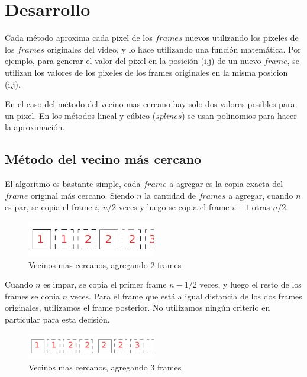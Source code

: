 \section{Desarrollo}

Cada método aproxima cada pixel de los $frames$ nuevos utilizando los pixeles de los $frames$ originales del video, y lo hace utilizando una función matemática. 
Por ejemplo, para generar el valor del pixel en la posición (i,j) de un nuevo $frame$, se utilizan los valores de los pixeles de los frames originales en la misma posicion (i,j). 

En el caso del método del vecino mas cercano hay solo dos valores posibles para un pixel. En los métodos lineal y cúbico ($splines$) se usan polinomios para hacer la aproximación.

\subsection{Método del vecino más cercano}
El algoritmo es bastante simple, cada $frame$ a agregar es la copia exacta del $frame$ original más cercano. Siendo $n$ la cantidad de $frames$ a agregar, cuando $n$ es par, se copia el frame $i$, $n/2$ veces y luego se copia el frame $i+1$ otras $n/2$. 

\begin{figure}[h!]
  \centering
    \includegraphics[width=0.5\textwidth]{imagenes/genCopypar.png}
  \caption{Vecinos mas cercanos, agregando 2 frames}
\end{figure}

Cuando $n$ es impar, se copia el primer frame $n-1/2$ veces, y luego el resto de los frames se copia $n$ veces. Para el frame que está a igual distancia de los dos frames originales, utilizamos el frame posterior. No utilizamos ningún criterio en particular para esta decisión.

\begin{figure}[h!]
  \centering
    \includegraphics[width=0.5\textwidth]{imagenes/genCopyImpar.png}
  \caption{Vecinos mas cercanos, agregando 3 frames}
\end{figure}

